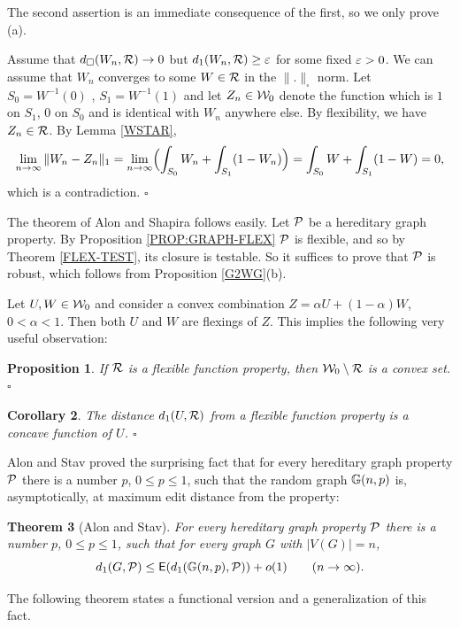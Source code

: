 \documentclass{article}
\newtheorem{theorem}{Theorem}[section]
\newtheorem{prop}[theorem]{Proposition}
\newtheorem{corollary}[theorem]{Corollary}
\newenvironment{proof}{\medskip\noindent{\bf Proof. }}{\hfill$\square$\medskip}
\begin{document}
\begin{proof}
The second assertion is an immediate consequence of the first, so we
only prove (a).

Assume that $d_{\square}(W_n,\mathcal{R})\to 0$ but $d_1(W_n,\mathcal{R})\geq\varepsilon$
for some fixed $\varepsilon>0$. We can assume that $W_n$ converges to some
$W\in\mathcal{R}$ in the $\|.\|_{\square}$ norm. Let $S_0=W^{-1}(0)$ ,
$S_1=W^{-1}(1)$ and let $Z_n\in\mathcal{W}_0$ denote the function which is
$1$ on $S_1$, $0$ on $S_0$ and is identical with $W_n$ anywhere else.
By flexibility, we have $Z_n\in\mathcal{R}$. By Lemma \ref{WSTAR},
\[
\lim_{n\to\infty}\| W_n-Z_n\|_1=\lim_{n\to\infty}
\Bigl(\int_{S_0}W_n+\int_{S_1}(1-W_n)\Bigr)=\int_{S_0}W+\int_{S_1}(1-W)=0,
\]
which is a contradiction.
\end{proof}

The theorem of Alon and Shapira \cite{AS} follows easily. Let $\mathcal{P}$
be a hereditary graph property. By Proposition \ref{PROP:GRAPH-FLEX}
$\mathcal{P}$ is flexible, and so by Theorem \ref{FLEX-TEST}, its closure is
testable. So it suffices to prove that $\mathcal{P}$ is robust, which follows
from Proposition \ref{G2WG}(b).

Let $U,W\in\mathcal{W}_0$ and consider a convex combination $Z=\alpha
U+(1-\alpha)W$, $0<\alpha<1$. Then both $U$ and $W$ are flexings
of $Z$. This implies the following very useful observation:

\begin{prop}\label{PP-CONV}
If $\mathcal{R}$ is a flexible function property, then $\mathcal{W}_0\setminus \mathcal{R}$
is a convex set. $\square$
\end{prop}

\begin{corollary}\label{DIST-CONCAVE}
The distance $d_1(U,\mathcal{R})$ from a flexible function property is a
concave function of $U$. $\square$
\end{corollary}

Alon and Stav \cite{ASt} proved the surprising fact that for every
hereditary graph property $\mathcal{P}$ there is a number $p$, $0\le p\le 1$,
such that the random graph ${\mathbb G}(n,p)$ is, asymptotically, at maximum
edit distance from the property:

\begin{theorem}[Alon and Stav]\label{ALON-STAV}
For every hereditary graph property $\mathcal{P}$ there is a number $p$,
$0\le p\le 1$, such that for every graph $G$ with $|V(G)|=n$,
\[
d_1(G,\mathcal{P})\le {\sf E}(d_1({\mathbb G}(n,p),\mathcal{P})) + o(1) \qquad (n\to\infty).
\]
\end{theorem}

The following theorem states a functional version and a
generalization of this fact.
\end{document}
